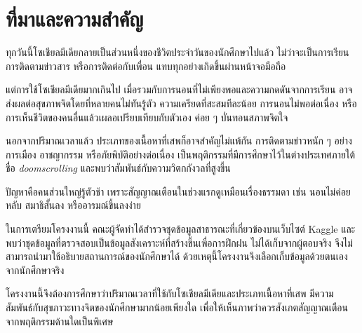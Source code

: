 \section{ที่มาและความสำคัญ}


ทุกวันนี้โซเชียลมีเดียกลายเป็นส่วนหนึ่งของชีวิตประจำวันของนักศึกษาไปแล้ว
ไม่ว่าจะเป็นการเรียน การติดตามข่าวสาร หรือการติดต่อกับเพื่อน
แทบทุกอย่างเกิดขึ้นผ่านหน้าจอมือถือ

แต่การใช้โซเชียลมีเดียมากเกินไป เมื่อรวมกับการนอนที่ไม่เพียงพอและความกดดันจากการเรียน
อาจส่งผลต่อสุขภาพจิตโดยที่หลายคนไม่ทันรู้ตัว ความเครียดที่สะสมทีละน้อย
การนอนไม่พอต่อเนื่อง หรือการเห็นชีวิตของคนอื่นแล้วเผลอเปรียบเทียบกับตัวเอง
ค่อย ๆ บั่นทอนสภาพจิตใจ

นอกจากปริมาณเวลาแล้ว ประเภทของเนื้อหาที่เสพก็อาจสำคัญไม่แพ้กัน
การติดตามข่าวหนัก ๆ อย่างการเมือง อาชญากรรม หรือภัยพิบัติอย่างต่อเนื่อง
เป็นพฤติกรรมที่มีการศึกษาไว้ในต่างประเทศภายใต้ชื่อ \textit{doomscrolling}
และพบว่าสัมพันธ์กับความวิตกกังวลที่สูงขึ้น

ปัญหาคือคนส่วนใหญ่รู้ตัวช้า เพราะสัญญาณเตือนในช่วงแรกดูเหมือนเรื่องธรรมดา
เช่น นอนไม่ค่อยหลับ สมาธิสั้นลง หรืออารมณ์ขึ้นลงง่าย

ในการเตรียมโครงงานนี้ คณะผู้จัดทำได้สำรวจชุดข้อมูลสาธารณะที่เกี่ยวข้องบนเว็บไซต์ \mbox{Kaggle}
\cite{singh_student_social_media,singh_social_media_addiction}
และพบว่าชุดข้อมูลที่ตรวจสอบเป็นข้อมูลสังเคราะห์ที่สร้างขึ้นเพื่อการฝึกฝน
ไม่ได้เก็บจากผู้ตอบจริง จึงไม่สามารถนำมาใช้อธิบายสถานการณ์ของนักศึกษาได้
ด้วยเหตุนี้โครงงานจึงเลือกเก็บข้อมูลด้วยตนเองจากนักศึกษาจริง

โครงงานนี้จึงต้องการศึกษาว่าปริมาณเวลาที่ใช้กับโซเชียลมีเดียและประเภทเนื้อหาที่เสพ
มีความสัมพันธ์กับสุขภาวะทางจิตของนักศึกษามากน้อยเพียงใด
เพื่อให้เห็นภาพว่าควรสังเกตสัญญาณเตือนจากพฤติกรรมด้านใดเป็นพิเศษ
